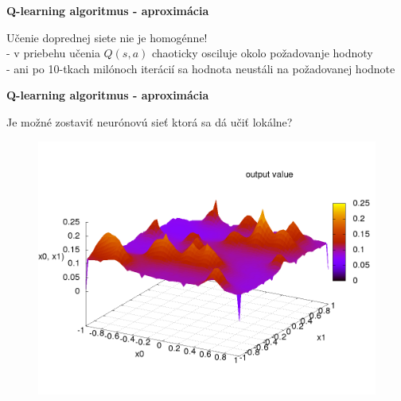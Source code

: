 \documentclass[xcolor=dvipsnames]{beamer}
\begin{document}
\begin{frame}{\bf Q-learning algoritmus - aproximácia}

Učenie doprednej siete nie je homogénne! \\
- v priebehu učenia $Q(s,a)$ chaoticky osciluje okolo požadovanje hodnoty \\
- ani po 10-tkach milónoch iterácií sa hodnota neustáli na požadovanej hodnote


\end{frame}


\begin{frame}{\bf Q-learning algoritmus - aproximácia}

Je možné zostaviť neurónovú sieť ktorá sa dá učiť lokálne?

\begin{figure}[!htb]
\includegraphics[scale=.4]{../pictures/gaussian.png}
\end{figure}

\end{frame}
\end{document}
